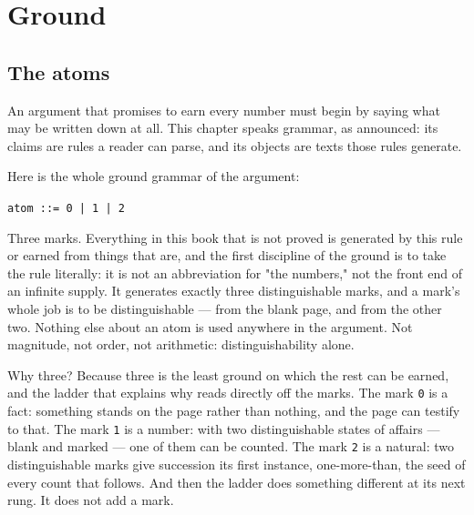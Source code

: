 \chapter{Ground}

\section{The atoms}

An argument that promises to earn every number must begin by saying what may be written
down at all. This chapter speaks grammar, as announced: its claims are rules a reader
can parse, and its objects are texts those rules generate.

Here is the whole ground grammar of the argument:

\begin{center}
\texttt{atom ::= 0 | 1 | 2}
\end{center}

Three marks. Everything in this book that is not proved is generated by this rule or
earned from things that are, and the first discipline of the ground is to take the rule
literally: it is not an abbreviation for "the numbers," not the front end of an infinite
supply. It generates exactly three distinguishable marks, and a mark's whole job is to
be distinguishable --- from the blank page, and from the other two. Nothing else about
an atom is used anywhere in the argument. Not magnitude, not order, not arithmetic:
distinguishability alone.

Why three? Because three is the least ground on which the rest can be earned, and the
ladder that explains why reads directly off the marks. The mark \texttt{0} is a fact:
something stands on the page rather than nothing, and the page can testify to that. The
mark \texttt{1} is a number: with two distinguishable states of affairs --- blank and
marked --- one of them can be counted. The mark \texttt{2} is a natural: two
distinguishable marks give succession its first instance, one-more-than, the seed of
every count that follows. And then the ladder does something different at its next
rung. It does not add a mark.

